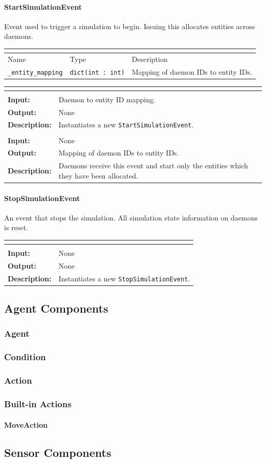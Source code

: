 \documentclass[titlepage]{article}
\newcommand{\operations}[1]{
\begin{center}
    \begin{longtable}{|p{4cm}|p{10cm + 2.0\tabcolsep}|}
    \hline
    \multicolumn{2}{|l|}{\cellcolor[gray]{0.5}{\textbf{Operations}}} \\ \hline
#1
    \end{longtable}
\end{center}
}
\newcommand{\operation}[4]{
    \hline
    \multicolumn{2}{|l|}{\cellcolor[gray]{0.8}{\texttt{#1}}} \\ \hline
    \hspace{7pt}\textbf{Input:} & #2 \\ \hline
    \hspace{7pt}\textbf{Output:} & #3 \\ \hline
    \hspace{7pt}\textbf{Description:} & #4 \\ \hline
}
\newcommand{\attributes}[1]{
    \begin{center}
        \begin{tabular}{|p{3cm}|p{3cm}|p{8cm}|}
            \multicolumn{3}{|l|}{\cellcolor[gray]{0.5}{\textbf{Attributes}}} \\ \hline
            \rowcolor[gray]{0.8} Name & Type & Description \\ \hline 
            #1
        \end{tabular}
    \end{center}
}
\newcommand{\attribute}[3]{
    \texttt{#1} & \texttt{#2} & #3 \\ \hline
}
\begin{document}
\paragraph{StartSimulationEvent}{Event used to trigger a simulation to begin.  Issuing this allocates entities across daemons.}
\attributes
{
    \attribute{\_entity\_mapping}{dict(int : int)}{Mapping of daemon IDs to entity IDs.}
}

\operations
{
    \operation{\_\_init\_\_(entity\_mapping)}{Daemon to entity ID mapping.}{None}{Instantiates a new \texttt{StartSimulationEvent}.}
    \operation{get\_mapping()}{None}{Mapping of daemon IDs to entity IDs.}{Daemons receive this event and start only the entities which they have been allocated.}
}

\paragraph{StopSimulationEvent}{An event that stops the simulation.  All simulation state information on daemons is reset.}
\operations
{
    \operation{\_\_init\_\_()}{None}{None}{Instantiates a new \texttt{StopSimulationEvent}.}
}

\subsection{Agent Components}
\subsubsection{Agent}
\subsubsection{Condition}
\subsubsection{Action}

\subsubsection{Built-in Actions}
\paragraph{MoveAction}

\subsection{Sensor Components}
\end{document}
